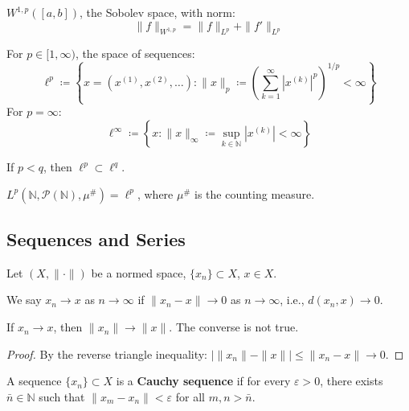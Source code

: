 \begin{example}
\( W^{1,p}([a,b]) \), the Sobolev space, with norm:
\[
\|f\|_{W^{1,p}} = \|f\|_{L^p} + \|f'\|_{L^p}
\]
\end{example}

\begin{example}
For \( p \in [1, \infty) \), the space of sequences:
\[
\ell^p \coloneqq \left\{ x = (x^{(1)}, x^{(2)}, \dots) : \|x\|_p \coloneqq \left( \sum_{k=1}^{\infty} |x^{(k)}|^p \right)^{1/p} < \infty \right\}
\]
For \( p = \infty \):
\[
\ell^\infty \coloneqq \left\{ x : \|x\|_\infty \coloneqq \sup_{k \in \mathbb{N}} |x^{(k)}| < \infty \right\}
\]
\end{example}

\begin{remark}
If \( p < q \), then \( \ell^p \subset \ell^q \).
\end{remark}

\begin{remark}
\( L^p(\mathbb{N}, \mathcal{P}(\mathbb{N}), \mu^{\#}) = \ell^p \), where \( \mu^{\#} \) is the counting measure.
\end{remark}

\subsection{Sequences and Series}

Let \( (X, \|\cdot\|) \) be a normed space, \( \{x_n\} \subset X \), \( x \in X \).

\begin{definition}
We say \( x_n \to x \) as \( n \to \infty \) if \( \|x_n - x\| \to 0 \) as \( n \to \infty \), i.e., \( d(x_n, x) \to 0 \).
\end{definition}

\begin{remark}
If \( x_n \to x \), then \( \|x_n\| \to \|x\| \). The converse is not true.
\end{remark}

\begin{proof}
By the reverse triangle inequality: \( |\|x_n\| - \|x\|| \leq \|x_n - x\| \to 0 \).
\end{proof}

\begin{definition}
A sequence \( \{x_n\} \subset X \) is a \textbf{Cauchy sequence} if for every \( \varepsilon > 0 \), there exists \( \bar{n} \in \mathbb{N} \) such that \( \|x_m - x_n\| < \varepsilon \) for all \( m, n > \bar{n} \).
\end{definition}

